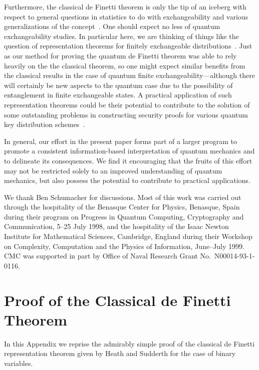\documentclass[12pt,aps,eqsecnum]{revtex4-1}
\begin{document}
Furthermore, the classical de Finetti theorem is only the tip of an
iceberg with respect to general questions in statistics to do with
exchangeability and various generalizations of the
concept~\cite{Aldous1985}.  One should expect no less of quantum
exchangeability studies.  In particular here, we are thinking of
things like the question of representation theorems for finitely
exchangeable distributions~\cite{Jaynes1986,Diaconis1977}.  Just as
our method for proving the quantum de Finetti theorem was able to
rely heavily on the the classical theorem, so one might expect
similar benefits from the classical results in the case of quantum
finite exchangeability---although there will certainly be new
aspects to the quantum case due to the possibility of entanglement
in finite exchangeable states.  A practical application of such
representation theorems could be their potential to contribute to the
solution of some outstanding problems in constructing security
proofs for various quantum key distribution
schemes~\cite{Gottesman2000}.

In general, our effort in the present paper forms part of a larger
program to promote a consistent information-based interpretation of
quantum mechanics and to delineate its consequences.  We find it
encouraging that the fruits of this effort may not be restricted
solely to an improved understanding of quantum mechanics, but also
possess the potential to contribute to practical applications.

\acknowledgments

We thank Ben Schumacher for discussions.  Most of this work was
carried out through the hospitality of the Benasque Center for
Physics, Benasque, Spain during their program on Progress in Quantum
Computing, Cryptography and Communication, 5--25 July 1998, and the
hospitality of the Isaac Newton Institute for Mathematical Sciences,
Cambridge, England during their Workshop on Complexity, Computation
and the Physics of Information, June--July 1999.  CMC was supported
in part by Office of Naval Research Grant No.~N00014-93-1-0116.

\appendix

\section{Proof of the Classical de Finetti Theorem}

In this Appendix we reprise the admirably simple proof of the
classical de Finetti representation theorem given by Heath and
Sudderth \cite{Heath1976} for the case of binary variables.
\end{document}
